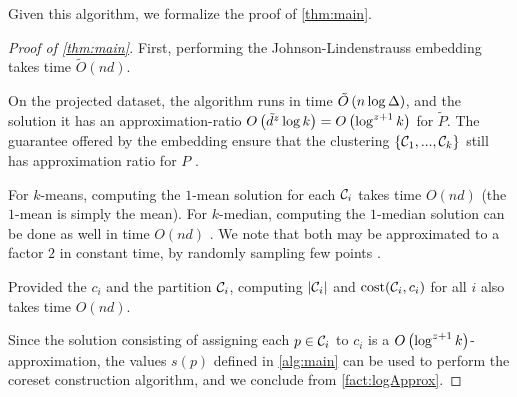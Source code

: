Given this algorithm, we formalize the proof of \cref{thm:main}.

\begin{proof}[Proof of \cref{thm:main}]
First, performing the Johnson-Lindenstrauss embedding takes time $\tilde O(nd)$.

On the projected dataset, the algorithm \fkmeans runs in time $\tilde O\left( n \log \Delta\right)$, and the solution it has an approximation-ratio $O\left( \tilde{d}^z \log k\right) = O\left(\log^{z+1} k\right)$ for $\tilde P$. 
The guarantee offered by the embedding ensure that the clustering $\left\{ \mathcal C_1,...,\mathcal C_k\right\}$ still has approximation ratio for $P$ \cite{makarychev2019performance}. 

For $k$-means, computing the $1$-mean solution for each $\mathcal C_i$ takes time $O(nd)$ (the $1$-mean is simply the mean). 
For $k$-median, computing the $1$-median solution can be done as well in time $O(nd)$ \cite{CohenLMPS16}. 
We note that both may be approximated to a factor $2$ in constant time, by randomly sampling few points \cite{neurips21}.

Provided the $c_i$ and the partition $\mathcal C_i$, computing $|\mathcal C_i|$ and $\operatorname{cost}(\mathcal C_i, c_i)$ for all $i$ also takes time $O(nd)$.

Since the solution consisting of assigning each $p \in \mathcal C_i$ to $c_i$ is a $O\left( \log^{z+1} k\right)$-approximation, the values $s(p)$ defined in \cref{alg:main} can be used to perform the coreset construction algorithm, and we conclude from \cref{fact:logApprox}.
\end{proof}

